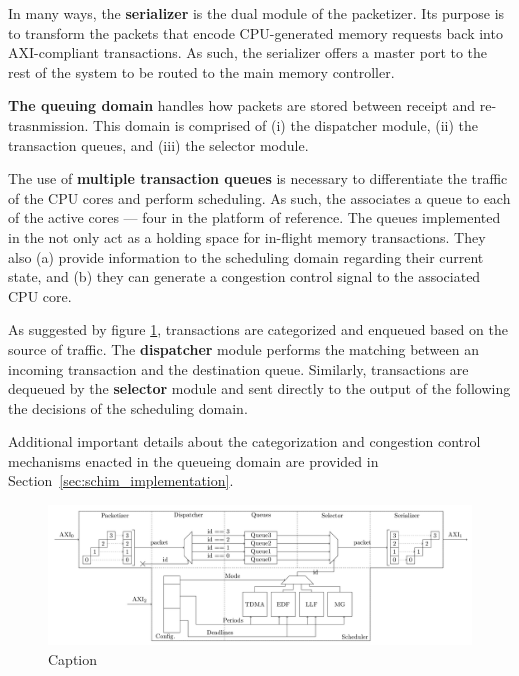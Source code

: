 In many ways, the {\bf serializer} is the dual module of the
packetizer. Its purpose is to transform the packets that encode
CPU-generated memory requests back into AXI-compliant transactions. As
such, the serializer offers a master port to the rest of the system to
be routed to the main memory controller.


\par{\bf The queuing domain} handles how packets are stored between
receipt and re-trasnmission. This domain is comprised of (i) the
dispatcher module, (ii) the transaction queues, and (iii) the selector
module.

The use of {\bf multiple transaction queues} is necessary to
differentiate the traffic of the CPU cores and perform scheduling. As
such, the \schim associates a queue to each of the active cores ---
four in the platform of reference.
The queues implemented in the \schim not only act as a holding space
for in-flight memory transactions.  They also (a) provide information
to the scheduling domain regarding their current state, and (b) they
can generate a congestion control signal to the associated CPU core.

As suggested by figure \ref{fig:MemorEDF_module_schema}, transactions
are categorized and enqueued based on the source of traffic. The {\bf
  dispatcher} module performs the matching between an incoming
transaction and the destination queue. Similarly, transactions are
dequeued by the {\bf selector} module and sent directly to the output
of the \schim following the decisions of the scheduling
domain.

Additional important details about the categorization and congestion
control mechanisms enacted in the queueing domain are provided in
Section~\ref{sec:schim_implementation}.

\begin{figure}
  \centering
  \includegraphics[scale=0.08]{images/MemorEDF_module_schema.png}
  \caption{Caption}
  \label{fig:MemorEDF_module_schema}
\end{figure}

